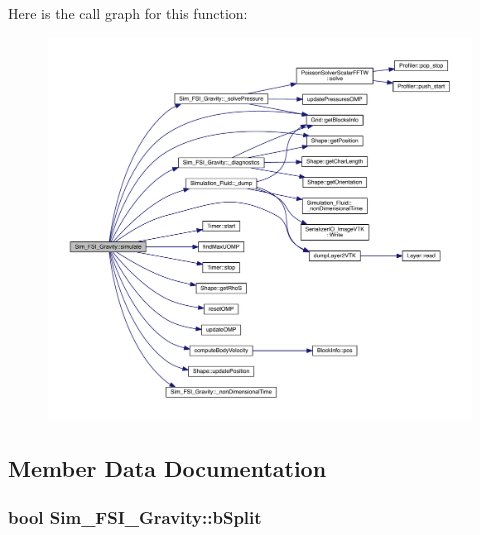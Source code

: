 Here is the call graph for this function\+:
\nopagebreak
\begin{figure}[H]
\begin{center}
\leavevmode
\includegraphics[width=350pt]{d6/de6/class_sim___f_s_i___gravity_add86d6f52de51511f0bb93714fc504c4_cgraph}
\end{center}
\end{figure}




\subsection{Member Data Documentation}
\hypertarget{class_sim___f_s_i___gravity_ab2ec5a560dba9573d0c78325ae6b3661}{}
\subsubsection[{b\+Split}]{\setlength{\rightskip}{0pt plus 5cm}bool Sim\+\_\+\+F\+S\+I\+\_\+\+Gravity\+::b\+Split\hspace{0.3cm}{\ttfamily [protected]}}\label{class_sim___f_s_i___gravity_ab2ec5a560dba9573d0c78325ae6b3661}
\hypertarget{class_sim___f_s_i___gravity_ac73b8e37488e3f55a67d3b62eb4a98bf}{}

